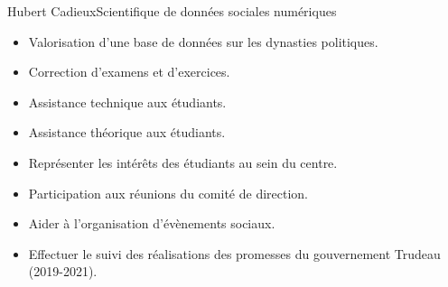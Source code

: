 \documentclass{article}
\begin{document}
\begin{cv}[avatar]{Hubert Cadieux}{Scientifique de données sociales numériques}
\begin{cvevent}[2023][2024]
    \begin{itemize}
        \item Valorisation d'une base de données sur les dynasties politiques.\\[10pt]
    \end{itemize}
\end{cvevent}

\begin{cvevent}[2022][2024]
    \begin{itemize}
        \item Correction d'examens et d'exercices.
        \item Assistance technique aux étudiants.
        \item Assistance théorique aux étudiants.\\[10pt]
    \end{itemize}
\end{cvevent}

\begin{cvevent}[2023][2024]
    \begin{itemize}
        \item Représenter les intérêts des étudiants au sein du centre.
        \item Participation aux réunions du comité de direction.
        \item Aider à l'organisation d'évènements sociaux.\\[10pt]
    \end{itemize}
\end{cvevent}

\begin{cvevent}[2021]
    \begin{itemize}
        \item Effectuer le suivi des réalisations des promesses du gouvernement Trudeau (2019-2021).
        \\[10pt]
    \end{itemize}
\end{cvevent}


\end{cv}
\end{document}
